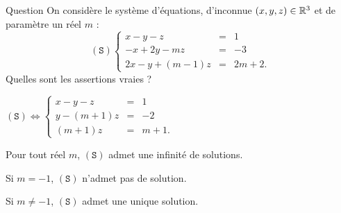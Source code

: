 \begin{multi}[multiple,feedback=
{\[(\mathtt{S}) \Leftrightarrow  
\left\{\begin{array}{rcc}
x-y-z&=&1\\
y-(m+1)z&=&-2\\ 
y+(m+1)z&=&2m\\ 
\end{array}\right.  \Leftrightarrow  
\left\{\begin{array}{rcc}
x-y-z&=&1\\
y-(m+1)z&=&-2\\ 
(m+1)z&=&m+1.\\ 
\end{array}\right.\]
Si \(m=-1\), \((\mathtt{S})\) admet une infinité de solutions : \(\{(-1+z,-2,z) \, ; \, z \in \Rr\}\).\\
Si \(m \neq -1\), \((\mathtt{S})\) admet une unique solution : \((1+m,-1+m,1)\).
}]{Question}
On considère le système d'équations, d'inconnue \((x,y,z)\in \mathbb{R}^3\) et de paramètre un réel \(m\) :
\[(\mathtt{S})\left\{\begin{array}{rcc}
x-y-z&=&1\\ -x+2y-mz&=&-3\\ 2x-y+(m-1)z&=&2m+2.\end{array}\right.\]
Quelles sont les assertions vraies ?

    \item* \((\mathtt{S}) \Leftrightarrow
\left\{\begin{array}{rcc}x-y-z&=&1\\y-(m+1)z&=&-2\\
(m+1)z&=&m+1.\end{array}\right.\)
    \item Pour tout réel \(m\), \((\mathtt{S})\) admet une infinité de solutions.
    \item Si \(m=-1\), \((\mathtt{S})\) n'admet pas de solution.
    \item* Si \(m \neq -1\), \((\mathtt{S})\) admet une unique solution.
\end{multi}


